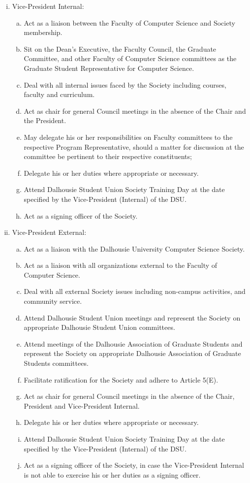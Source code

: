 \documentclass[]{report}
\begin{document}
\begin{enumerate}
\begin{enumerate}[i.]
			\item Vice-President Internal:
			\begin{enumerate}[(a)]
				\item Act as a liaison between the Faculty of Computer Science and Society membership.
				\item Sit on the Dean's Executive, the Faculty Council, the Graduate Committee, and other Faculty of Computer Science committees as the Graduate Student Representative for Computer Science.
				\item Deal with all internal issues faced by the Society including courses, faculty and curriculum.
				\item Act as chair for general Council meetings in the absence of the Chair and the President.
				\item May delegate his or her responsibilities on Faculty committees to the respective Program Representative, should a matter for discussion at the committee be pertinent to their respective constituents;
				\item Delegate his or her duties where appropriate or necessary.
				\item Attend Dalhousie Student Union Society Training Day at the date specified by the Vice-President (Internal) of the DSU.
				\item Act as a signing officer of the Society.
			\end{enumerate}
		
			\item Vice-President External:
			\begin{enumerate}[(a)]
				\item Act as a liaison with the Dalhousie University Computer Science Society.
				\item Act as a liaison with all organizations external to the Faculty of Computer Science.
				\item Deal with all external Society issues including non-campus activities, and community service.
				\item Attend Dalhousie Student Union meetings and represent the Society on appropriate Dalhousie Student Union committees.
				\item Attend meetings of the Dalhousie Association of Graduate Students and represent the Society on appropriate Dalhousie Association of Graduate Students committees.
				\item Facilitate ratification for the Society and adhere to Article 5(E).
				\item Act as chair for general Council meetings in the absence of the Chair, President and Vice-President Internal.
				\item Delegate his or her duties where appropriate or necessary.
				\item Attend Dalhousie Student Union Society Training Day at the date specified by the Vice-President (Internal) of the DSU.
				\item Act as a signing officer of the Society, in case the Vice-President Internal is not able to exercise his or her duties as a signing officer.
			\end{enumerate}
		

\end{enumerate}
\end{enumerate}
\end{document}
